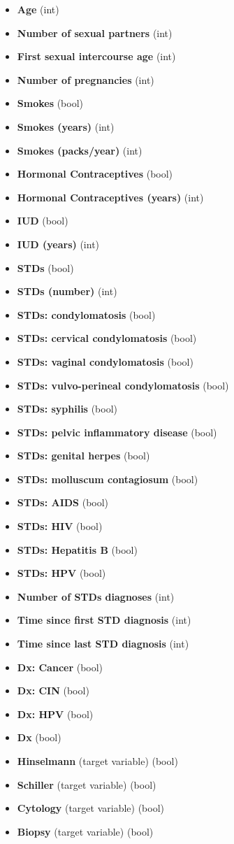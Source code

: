 \documentclass{llncs}
\begin{document}
\begin{itemize}
	\item \textbf{Age} (int)
	\item \textbf{Number of sexual partners} (int)
	\item \textbf{First sexual intercourse age} (int)
	\item \textbf{Number of pregnancies} (int)
	\item \textbf{Smokes} (bool)
	\item \textbf{Smokes (years)} (int)
	\item \textbf{Smokes (packs/year)} (int)
	\item \textbf{Hormonal Contraceptives} (bool)
	\item \textbf{Hormonal Contraceptives (years)} (int)
	\item \textbf{IUD} (bool)
	\item \textbf{IUD (years)} (int)
	\item \textbf{STDs} (bool)
	\item \textbf{STDs (number)} (int)
	\item \textbf{STDs: condylomatosis} (bool)
	\item \textbf{STDs: cervical condylomatosis} (bool)
	\item \textbf{STDs: vaginal condylomatosis} (bool)
	\item \textbf{STDs: vulvo-perineal condylomatosis} (bool)
	\item \textbf{STDs: syphilis} (bool)
	\item \textbf{STDs: pelvic inflammatory disease} (bool)
	\item \textbf{STDs: genital herpes} (bool)
	\item \textbf{STDs: molluscum contagiosum} (bool)
	\item \textbf{STDs: AIDS} (bool)
	\item \textbf{STDs: HIV} (bool)
	\item \textbf{STDs: Hepatitis B} (bool)
	\item \textbf{STDs: HPV} (bool)
	\item \textbf{Number of STDs diagnoses} (int)
	\item \textbf{Time since first STD diagnosis} (int)
	\item \textbf{Time since last STD diagnosis} (int)
	\item \textbf{Dx: Cancer} (bool)
	\item \textbf{Dx: CIN} (bool)
	\item \textbf{Dx: HPV} (bool)
	\item \textbf{Dx} (bool)
	\item \textbf{Hinselmann} (target variable) (bool)
	\item \textbf{Schiller} (target variable) (bool)
	\item \textbf{Cytology} (target variable) (bool)
	\item \textbf{Biopsy} (target variable) (bool)
\end{itemize}
\end{document}
